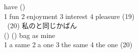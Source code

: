 \documentclass[uplatex]{jsarticle}
\begin{document}
\hspace{10mm}have (\hspace{10mm})\\
\hspace{10mm}\textcircled{\normalsize1}fun \textcircled{\normalsize2}enjoyment 
\textcircled{\normalsize3}interest \textcircled{\normalsize4}pleasure 
\hspace{\fill}(19)\underline{\hspace{35mm}}\\
\ (20) 私のと同じかばん\\
\hspace{10mm}(\hspace{10mm}) (\hspace{10mm}) bag as mine\\
\hspace{10mm}\textcircled{\normalsize1}a same \textcircled{\normalsize2}a one 
\textcircled{\normalsize3}the same \textcircled{\normalsize4}the one 
\hspace{\fill}(20)\underline{\hspace{35mm}}\\
% 
\end{document}
